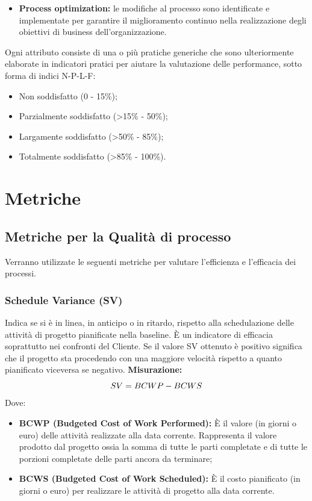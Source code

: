 \begin{itemize}
\begin{itemize}
            \item \textbf{Process optimization:} le modifiche al processo sono identificate e implementate per garantire il miglioramento continuo nella realizzazione degli obiettivi di business dell'organizzazione.
        \end{itemize}
Ogni attributo consiste di una o più pratiche generiche che sono ulteriormente elaborate in indicatori pratici per aiutare la valutazione delle performance, sotto forma di indici N-P-L-F:
\begin{itemize}
    \item Non soddisfatto (0 - 15\%);
    \item Parzialmente soddisfatto (>15\% - 50\%);
    \item Largamente soddisfatto (>50\% - 85\%);
    \item Totalmente soddisfatto (>85\% - 100\%).
\end{itemize}

\end{itemize}
\clearpage

\section{Metriche}
\label{C}
\subsection{Metriche per la Qualità di processo}
	Verranno  utilizzate  le  seguenti  metriche  per  valutare  l’efficienza  e  l’efficacia  dei processi.
	 	\subsubsection{Schedule Variance (SV)} Indica se si è in linea, in anticipo o in ritardo, rispetto alla schedulazione delle
attività di progetto pianificate nella baseline.
	 	È un indicatore di efficacia soprattutto nei confronti del Cliente.
	 	Se il valore SV ottenuto è positivo significa che il progetto sta procedendo con una
maggiore velocità rispetto a quanto pianificato viceversa se negativo.\newline
	 	\textbf{Misurazione:}
\newline
	 	\[
	 		SV = BCWP-BCWS \newline
	 	\]
 		Dove:
 		\begin{itemize}
 			\item \textbf{BCWP (Budgeted Cost of Work Performed):} È il valore (in giorni
o euro) delle attività realizzate alla data corrente. Rappresenta il valore
prodotto dal progetto ossia la somma di tutte le parti completate e di tutte
le porzioni completate delle parti ancora da terminare;
 			\item \textbf{BCWS (Budgeted Cost of Work Scheduled):} È il costo pianificato (in giorni o euro) per realizzare le attività di progetto alla data corrente. \newline
 		\end{itemize}
